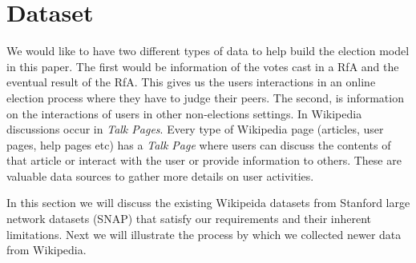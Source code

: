 
\section{Dataset}
\label{sec:dataset}

We would like to have two different types of data to help build the election model in this paper. The first would be information of the votes cast in a RfA and the eventual result of the RfA. This gives us the users interactions in an online election process where they have to judge their peers. The second, is information on the interactions of users in other non-elections settings. In Wikipedia discussions occur in \textit{Talk Pages}. Every type of Wikipedia page (articles, user pages, help pages etc) has a \textit{Talk Page} where users can discuss the contents of that article or interact with the user or provide information to others. These are valuable data sources to gather more details on user activities.
\smallskip

In this section we will discuss the existing Wikipeida datasets from Stanford large network datasets (SNAP) \cite{snapnets} that satisfy our requirements and their inherent limitations. Next we will illustrate the process by which we collected newer data from Wikipedia.


